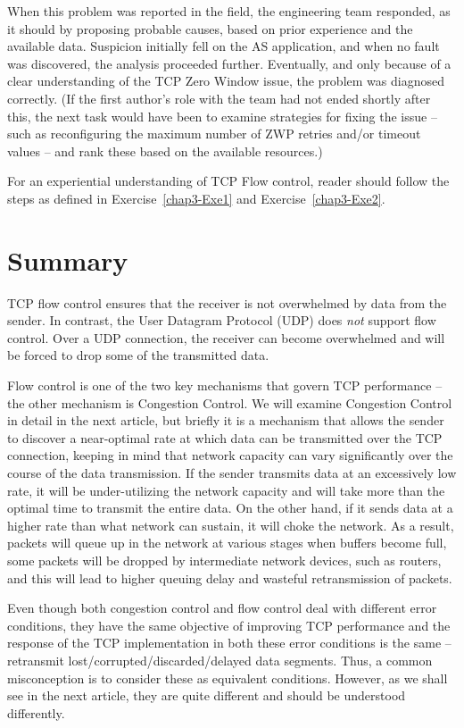 \begin{multicols}{2}
When this problem was reported in the field, the engineering team responded, as it should by proposing probable causes, based on prior experience and the available data. Suspicion initially fell on the AS application, and when no fault was discovered, the analysis proceeded further. Eventually, and only because of a clear understanding of the TCP Zero Window issue, the problem was diagnosed correctly. (If the first author’s role with the team had not ended shortly after this, the next task would have been to examine strategies for fixing the issue – such as reconfiguring the maximum number of ZWP retries and/or timeout values – and rank these based on the available resources.)

For an experiential understanding of TCP Flow control, reader should follow the steps as defined in Exercise~\ref{chap3-Exe1} and Exercise~\ref{chap3-Exe2}.

\section{Summary}

TCP flow control ensures that the receiver is not overwhelmed by data from the sender. In contrast, the User Datagram Protocol (UDP) does \textit{not} support flow control. Over a UDP connection, the receiver can become overwhelmed and will be forced to drop some of the transmitted data.

Flow control is one of the two key mechanisms that govern TCP performance – the other mechanism is Congestion Control. We will examine Congestion Control in detail in the next article, but briefly it is a mechanism that allows the sender to discover a near-optimal rate at which data can be transmitted over the TCP connection, keeping in mind that network capacity can vary significantly over the course of the data transmission. If the sender transmits data at an excessively low rate, it will be under-utilizing the network capacity and will take more than the optimal time to transmit the entire data. On the other hand, if it sends data at a higher rate than what network can sustain, it will choke the network. As a result, packets will queue up in the network at various stages when buffers become full, some packets will be dropped by intermediate network devices, such as routers, and this will lead to higher queuing delay and wasteful retransmission of packets.

Even though both congestion control and flow control deal with different error conditions, they have the same objective of improving TCP performance and the response of the TCP implementation in both these error conditions is the same – retransmit lost/corrupted/discarded/delayed data segments. Thus, a common misconception is to consider these as equivalent conditions. However, as we shall see in the next article, they are quite different and should be understood differently.


\end{multicols}
